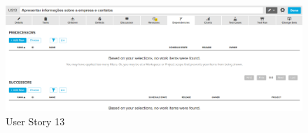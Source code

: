 \begin{figure}[h]
    \centering
    \label{fig01}
        \includegraphics[keepaspectratio=true,scale=0.3]{figuras/RallyDev/US13.eps}
    \caption{User Story 13}
\end{figure}

\tab \\ \\ \\ \\ \\ \\ \\ \\ \\ \\ \\ \\ \\ \\ \\ \\ \\ \\ \\ \\ \\ \\ \\ \\ \\ \\ \\ \\ \\ \\

